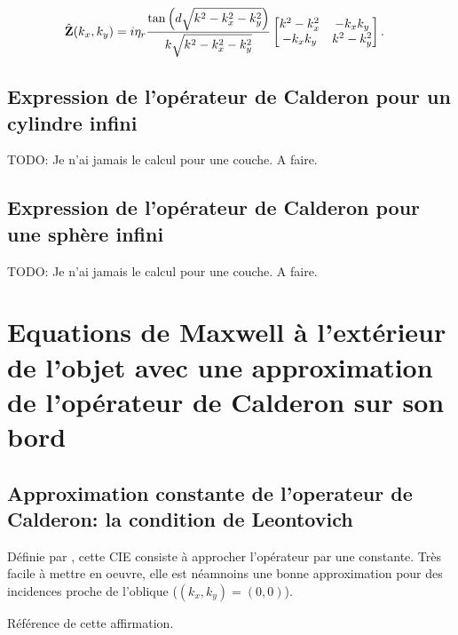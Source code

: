         \begin{align*}
          \hat {\mathbf{Z}}(k_x,k_y) &= i\eta_r\dfrac{\tan\left(d\sqrt{k^2-k_x^2-k_y^2}\right)}{k \sqrt{k^2-k_x^2-k_y^2}}
          \begin{bmatrix}
            k^2-k_x^2  & -k_xk_y
            \\
            -k_xk_y & k^2-k_y^2
          \end{bmatrix}.
        \end{align*}

    \subsection{Expression de l'opérateur de Calderon pour un cylindre infini}

        \begin{REM}
            TODO: Je n'ai jamais le calcul pour une couche. A faire.
        \end{REM}

    \subsection{Expression de l'opérateur de Calderon pour une sphère infini}

        \begin{REM}
            TODO: Je n'ai jamais le calcul pour une couche. A faire.
        \end{REM}

\section{Equations de Maxwell à l'extérieur de l'objet avec une approximation de l'opérateur de Calderon sur son bord}

    \subsection{Approximation constante de l'operateur de Calderon: la condition de Leontovich}
        
        Définie par \cite{leontovich_investigations_1948}, cette CIE consiste à approcher l'opérateur par une constante. Très facile à mettre en oeuvre, elle est néamnoins une bonne approximation pour des incidences proche de l'oblique (\((k_x,k_y)=(0,0)\)).

        \begin{REM}
            Référence de cette affirmation.
        \end{REM}

